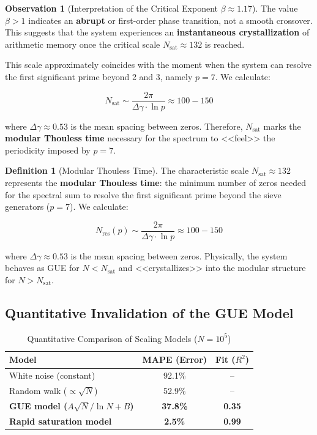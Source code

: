 \documentclass[12pt, a4paper]{article}
\theoremstyle{plain}
\theoremstyle{definition}
\newtheorem{definicion}[teorema]{Definition}
\newtheorem{observacion}[teorema]{Observation}
\theoremstyle{remark}
\begin{document}
\begin{observacion}[Interpretation of the Critical Exponent $\beta \approx 1.17$]
The value $\beta > 1$ indicates an \textbf{abrupt} or first-order phase 
transition, not a smooth crossover. This suggests that the system experiences 
an \textbf{instantaneous crystallization} of arithmetic memory once the 
critical scale $N_{\text{sat}} \approx 132$ is reached.

This scale approximately coincides with the moment when the system can 
resolve the first significant prime beyond 2 and 3, namely $p=7$. 
We calculate:

\[
N_{\text{sat}} \sim \frac{2\pi}{\Delta \gamma \cdot \ln p} \approx 100-150
\]

where $\Delta \gamma \approx 0.53$ is the mean spacing between zeros. 
Therefore, $N_{\text{sat}}$ marks the \textbf{modular Thouless time} 
necessary for the spectrum to <<feel>> the periodicity imposed by $p=7$.
\end{observacion}


\begin{definicion}[Modular Thouless Time]
\label{def:tiempo_thouless}
The characteristic scale $N_{\text{sat}} \approx 132$ represents the 
\textbf{modular Thouless time}: the minimum number of zeros needed 
for the spectral sum to resolve the first significant prime beyond 
the sieve generators ($p=7$). We calculate:

\[
N_{\text{res}}(p) \sim \frac{2\pi}{\Delta \gamma \cdot \ln p} \approx 100-150
\]

where $\Delta \gamma \approx 0.53$ is the mean spacing between zeros. 
Physically, the system behaves as GUE for $N < N_{\text{sat}}$ 
and <<crystallizes>> into the modular structure for $N > N_{\text{sat}}$.
\end{definicion}

\subsection{Quantitative Invalidation of the GUE Model}
\label{subsec:invalidacion_gue}

\begin{table}[H]
\centering
\caption{Quantitative Comparison of Scaling Models ($N=10^5$)}
\label{tab:modelos_snr}
\begin{tabular}{@{}lcc@{}}
\toprule
\textbf{Model} & \textbf{MAPE (Error)} & \textbf{Fit ($R^2$)} \\
\midrule
White noise (constant) & 92.1\% & -- \\
Random walk ($\propto \sqrt{N}$) & 52.9\% & -- \\
\textbf{GUE model ($A\sqrt{N}/\ln N + B$)} & \textbf{37.8\%} & \textbf{0.35} \\
\textbf{Rapid saturation model} & \textbf{2.5\%} & \textbf{0.99} \\
\bottomrule
\end{tabular}
\end{table}
\end{document}
